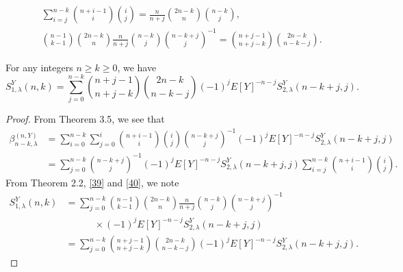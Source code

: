 \documentclass[10pt,a4paper]{amsart}
\begin{document}
\begin{equation} \label{39}
\begin{aligned}
&\sum_{i=j}^{n-k}\binom{n+i-1}{i}\binom{i}{j}=\frac{n}{n+j}\binom{2n-k}{n}\binom{n-k}{j}, \\
&\binom{n-1}{k-1}\binom{2n-k}{n}\frac{n}{n+j}\binom{n-k}{j}\binom{n-k+j}{j}^{-1}=\binom{n+j-1}{n+j-k}\binom{2n-k}{n-k-j}.
\end{aligned}
\end{equation}

\begin{theorem}
For any integers $n \ge k \ge 0$, we have
\begin{equation*}
S_{1,\lambda}^{Y}(n,k)=\sum_{j=0}^{n-k}\binom{n+j-1}{n+j-k}\binom{2n-k}{n-k-j}(-1)^{j}E[Y]^{-n-j}S_{2,\lambda}^{Y}(n-k+j,j).
\end{equation*}
\end{theorem}

\begin{proof}
From Theorem 3.5, we see that 
\begin{equation} \label{40}
\begin{aligned}
\beta_{n-k,\lambda}^{(n,Y)}&=\sum_{i=0}^{n-k}\sum_{j=0}^{i}\binom{n+i-1}{i}\binom{i}{j}\binom{n-k+j}{j}^{-1}(-1)^{j}E[Y]^{-n-j}S_{2,\lambda}^{Y}(n-k+j,j) \\
&=\sum_{j=0}^{n-k}\binom{n-k+j}{j}^{-1}(-1)^{j}E[Y]^{-n-j}S_{2,\lambda}^{Y}(n-k+j,j)\sum_{i=j}^{n-k}\binom{n+i-1}{i}\binom{i}{j}.
\end{aligned}
\end{equation}
From Theorem 2.2, \eqref{39} and \eqref{40}, we note
\begin{align*}
S_{1,\lambda}^{Y}(n,k)&=\sum_{j=0}^{n-k}\binom{n-1}{k-1}\binom{2n-k}{n}\frac{n}{n+j}\binom{n-k}{j}\binom{n-k+j}{j}^{-1}\\
&\quad\quad\quad \times (-1)^{j}E[Y]^{-n-j}S_{2,\lambda}^{Y}(n-k+j,j) \\
&=\sum_{j=0}^{n-k} \binom{n+j-1}{n+j-k}\binom{2n-k}{n-k-j}(-1)^{j}E[Y]^{-n-j}S_{2,\lambda}^{Y}(n-k+j,j).
\end{align*}
\end{proof}
\end{document}
